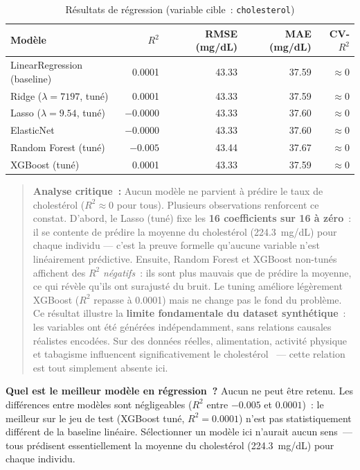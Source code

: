 \begin{table}[H]
\centering
\caption{Résultats de régression (variable cible~: \texttt{cholesterol})}
\label{tab:regression_results}
\begin{tabular}{lrrrr}
\toprule
Modèle & $R^2$ & RMSE (mg/dL) & MAE (mg/dL) & CV-$R^2$ \\
\midrule
LinearRegression (baseline) & 0.0001  & 43.33 & 37.59 & $\approx 0$ \\
Ridge ($\lambda=7197$, tuné) & 0.0001  & 43.33 & 37.59 & $\approx 0$ \\
Lasso ($\lambda=9.54$, tuné) & $-0.0000$ & 43.33 & 37.60 & $\approx 0$ \\
ElasticNet                   & $-0.0000$ & 43.33 & 37.60 & $\approx 0$ \\
Random Forest (tuné)         & $-0.005$  & 43.44 & 37.67 & $\approx 0$ \\
XGBoost (tuné)               & 0.0001  & 43.33 & 37.59 & $\approx 0$ \\
\bottomrule
\end{tabular}
\end{table}

\begin{quote}
\textbf{Analyse critique~:} Aucun modèle ne parvient à prédire le taux de cholestérol ($R^2 \approx 0$ pour tous). Plusieurs observations renforcent ce constat. D'abord, le Lasso (tuné) fixe les \textbf{16 coefficients sur 16 à zéro}~: il se contente de prédire la moyenne du cholestérol (224.3~mg/dL) pour chaque individu --- c'est la preuve formelle qu'aucune variable n'est linéairement prédictive. Ensuite, Random Forest et XGBoost non-tunés affichent des $R^2$ \textit{négatifs}~: ils sont plus mauvais que de prédire la moyenne, ce qui révèle qu'ils ont surajusté du bruit. Le tuning améliore légèrement XGBoost ($R^2$ repasse à 0.0001) mais ne change pas le fond du problème. Ce résultat illustre la \textbf{limite fondamentale du dataset synthétique}~: les variables ont été générées indépendamment, sans relations causales réalistes encodées. Sur des données réelles, alimentation, activité physique et tabagisme influencent significativement le cholestérol~\cite{booth2012} --- cette relation est tout simplement absente ici.
\end{quote}

\textbf{Quel est le meilleur modèle en régression~?} Aucun ne peut être retenu. Les différences entre modèles sont négligeables ($R^2$ entre $-0.005$ et $0.0001$)~: le \og meilleur \fg{} sur le jeu de test (XGBoost tuné, $R^2=0.0001$) n'est pas statistiquement différent de la baseline linéaire. Sélectionner un modèle ici n'aurait aucun sens~--- tous prédisent essentiellement la moyenne du cholestérol (224.3~mg/dL) pour chaque individu.

